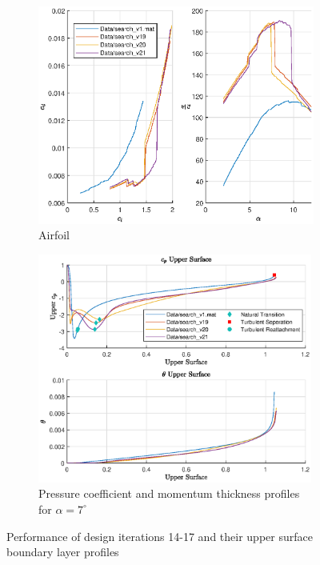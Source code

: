 \documentclass{article}
\begin{document}
\begin{figure}[H]
    \centering
    \begin{subfigure}{0.45\textwidth}
        \centering
        \includegraphics[width=1.2\textwidth, center]{figures/hiRe_lod_21.eps}
        \caption{Airfoil}
        \label{fig:v21_lod}
    \end{subfigure}
    \begin{subfigure}{0.54\textwidth}
        \centering
        \includegraphics[width=0.99\textwidth]{figures/hiRe_upperprofile_21_a7.eps}
        \caption{Pressure coefficient and momentum thickness profiles for $\alpha = 7^\circ$}
        \label{fig:v21_uprofile}
    \end{subfigure}
    \caption{Performance of design iterations 14-17 and their upper surface boundary layer profiles}
\end{figure}
\end{document}
